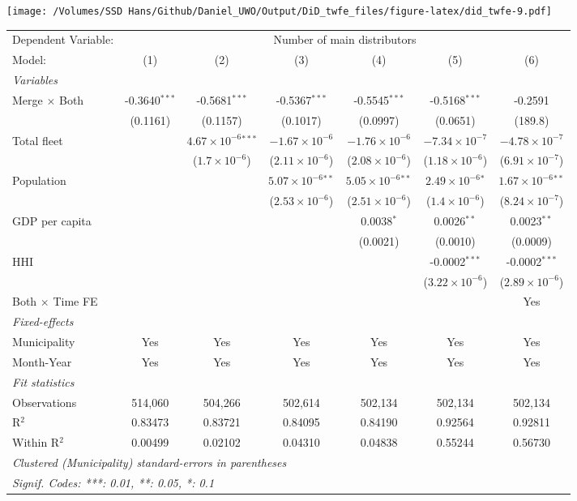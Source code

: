 \documentclass[
]{article}
\begin{document}
\texttt{[image: /Volumes/SSD Hans/Github/Daniel\_UWO/Output/DiD\_twfe\_files/figure-latex/did\_twfe-9.pdf]}

\begin{tabular}{lcccccc}
\tabularnewline\midrule\midrule
Dependent Variable:&\multicolumn{6}{c}{Number of main distributors}\\
Model:&(1) & (2) & (3) & (4) & (5) & (6)\\
\midrule \emph{Variables}&   &   &   &   &   &  \\
Merge $\times $ Both & -0.3640$^{***}$ & -0.5681$^{***}$ & -0.5367$^{***}$ & -0.5545$^{***}$ & -0.5168$^{***}$ & -0.2591\\
  &(0.1161) & (0.1157) & (0.1017) & (0.0997) & (0.0651) & (189.8)\\
Total fleet &    & $4.67\times 10^{-6}$$^{***}$ & $-1.67\times 10^{-6}$ & $-1.76\times 10^{-6}$ & $-7.34\times 10^{-7}$ & $-4.78\times 10^{-7}$\\
  &   & ($1.7\times 10^{-6}$) & ($2.11\times 10^{-6}$) & ($2.08\times 10^{-6}$) & ($1.18\times 10^{-6}$) & ($6.91\times 10^{-7}$)\\
Population &    &    & $5.07\times 10^{-6}$$^{**}$ & $5.05\times 10^{-6}$$^{**}$ & $2.49\times 10^{-6}$$^{*}$ & $1.67\times 10^{-6}$$^{**}$\\
  &   &    & ($2.53\times 10^{-6}$) & ($2.51\times 10^{-6}$) & ($1.4\times 10^{-6}$) & ($8.24\times 10^{-7}$)\\
GDP per capita &    &    &    & 0.0038$^{*}$ & 0.0026$^{**}$ & 0.0023$^{**}$\\
  &   &    &    & (0.0021) & (0.0010) & (0.0009)\\
HHI &    &    &    &    & -0.0002$^{***}$ & -0.0002$^{***}$\\
  &   &    &    &    & ($3.22\times 10^{-6}$) & ($2.89\times 10^{-6}$)\\
Both $\times$ Time FE &  &  &  &  &  & Yes\\
\midrule \emph{Fixed-effects}&   &   &   &   &   &  \\
Municipality & Yes & Yes & Yes & Yes & Yes & Yes\\
Month-Year & Yes & Yes & Yes & Yes & Yes & Yes\\
\midrule \emph{Fit statistics}&  & & & & & \\
Observations & 514,060&504,266&502,614&502,134&502,134&502,134\\
R$^2$ & 0.83473&0.83721&0.84095&0.84190&0.92564&0.92811\\
Within R$^2$ & 0.00499&0.02102&0.04310&0.04838&0.55244&0.56730\\
\midrule\midrule\multicolumn{7}{l}{\emph{Clustered (Municipality) standard-errors in parentheses}}\\
\multicolumn{7}{l}{\emph{Signif. Codes: ***: 0.01, **: 0.05, *: 0.1}}\\
\end{tabular}
\end{document}

